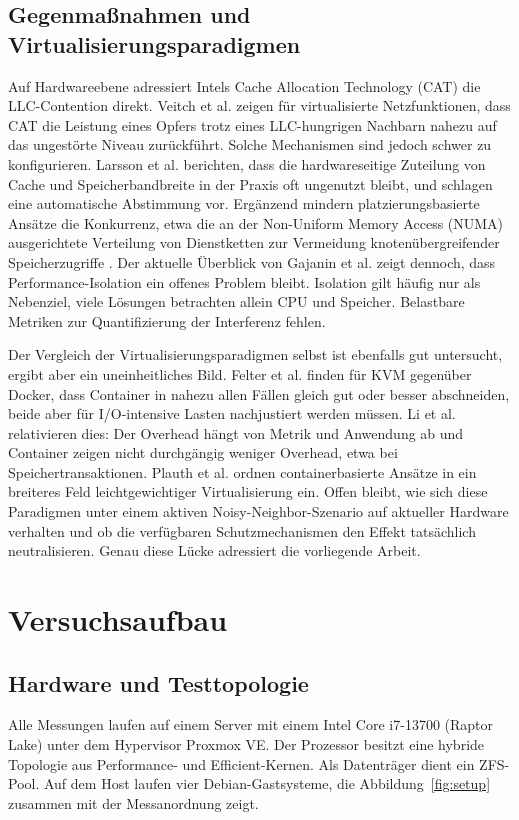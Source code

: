 \documentclass[conference]{IEEEtran}
\begin{document}
\subsection{Gegenmaßnahmen und Virtualisierungsparadigmen}
Auf Hardwareebene adressiert Intels Cache Allocation Technology (CAT) die LLC-Contention direkt. Veitch et al. \cite{veitch2017performance} zeigen für virtualisierte Netzfunktionen, dass CAT die Leistung eines Opfers trotz eines LLC-hungrigen Nachbarn nahezu auf das ungestörte Niveau zurückführt. Solche Mechanismen sind jedoch schwer zu konfigurieren. Larsson et al. \cite{larsson2025esther} berichten, dass die hardwareseitige Zuteilung von Cache und Speicherbandbreite in der Praxis oft ungenutzt bleibt, und schlagen eine automatische Abstimmung vor. Ergänzend mindern platzierungsbasierte Ansätze die Konkurrenz, etwa die an der Non-Uniform Memory Access (NUMA) ausgerichtete Verteilung von Dienstketten zur Vermeidung knotenübergreifender Speicherzugriffe \cite{chintapalli2022numasfp}. Der aktuelle Überblick von Gajanin et al. \cite{gajanin2025performance} zeigt dennoch, dass Performance-Isolation ein offenes Problem bleibt. Isolation gilt häufig nur als Nebenziel, viele Lösungen betrachten allein CPU und Speicher. Belastbare Metriken zur Quantifizierung der Interferenz fehlen.

Der Vergleich der Virtualisierungsparadigmen selbst ist ebenfalls gut untersucht, ergibt aber ein uneinheitliches Bild. Felter et al. \cite{felter2015updated} finden für KVM gegenüber Docker, dass Container in nahezu allen Fällen gleich gut oder besser abschneiden, beide aber für I/O-intensive Lasten nachjustiert werden müssen. Li et al. \cite{li2017performance} relativieren dies: Der Overhead hängt von Metrik und Anwendung ab und Container zeigen nicht durchgängig weniger Overhead, etwa bei Speichertransaktionen. Plauth et al. \cite{plauth2017performance} ordnen containerbasierte Ansätze in ein breiteres Feld leichtgewichtiger Virtualisierung ein. Offen bleibt, wie sich diese Paradigmen unter einem aktiven Noisy-Neighbor-Szenario auf aktueller Hardware verhalten und ob die verfügbaren Schutzmechanismen den Effekt tatsächlich neutralisieren. Genau diese Lücke adressiert die vorliegende Arbeit.

\section{Versuchsaufbau}
\label{sec:setup}

\subsection{Hardware und Testtopologie}
Alle Messungen laufen auf einem Server mit einem Intel Core i7-13700 (Raptor Lake) unter dem Hypervisor Proxmox VE. Der Prozessor besitzt eine hybride Topologie aus Performance- und Efficient-Kernen. Als Datenträger dient ein ZFS-Pool. Auf dem Host laufen vier Debian-Gastsysteme, die Abbildung~\ref{fig:setup} zusammen mit der Messanordnung zeigt.
\end{document}
